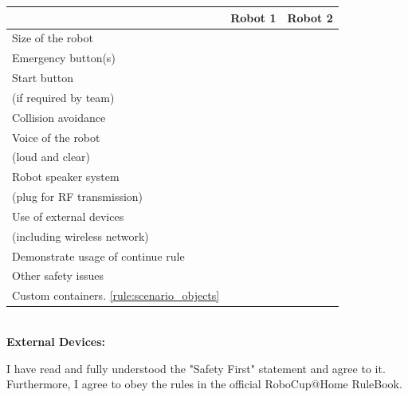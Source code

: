 \begin{tabular}{|l|c|c|}
\hline
~ & {\bf Robot 1} & {\bf Robot 2}\\
\hline
\hline
Size of the robot&\hspace{7cm} & \hspace{7cm} \\
\hline
Emergency button(s) &\hspace{7cm} & \hspace{7cm} \\
\hline
Start button \\ (if required by team) &\hspace{7cm} & \hspace{7cm} \\
\hline
Collision avoidance &\hspace{7cm} & \hspace{7cm} \\
\hline
Voice of the robot \\ (loud and clear) &\hspace{7cm} & \hspace{7cm} \\
\hline
Robot speaker system \\ (plug for RF transmission)&\hspace{7cm} & \hspace{7cm} \\
\hline
Use of external devices \\ (including wireless network) &\hspace{7cm} & \hspace{7cm} \\
\hline
Demonstrate usage of continue rule&\hspace{7cm} & \hspace{7cm} \\
\hline
Other safety issues &\hspace{7cm} & \hspace{7cm} \\
\hline
Custom containers. \ref{rule:scenario_objects} &\hspace{7cm} & \hspace{7cm} \\
\hline
\end{tabular}\\[1cm]

{\bf External Devices:}
\vspace{2cm}

\vfill

\noindent I have read and fully understood the "Safety First" statement and agree to it. 
Furthermore, I agree to obey the rules in the official RoboCup@Home RuleBook.

